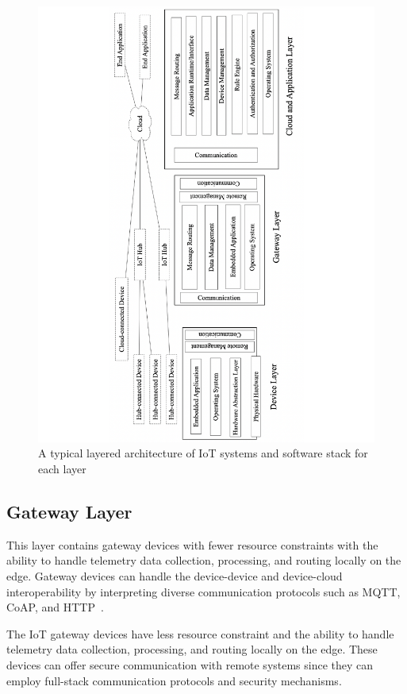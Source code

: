  \begin{figure}
  \centering 
   \includegraphics[height=0.9\textheight]{./imgs/arch1.pdf}
  \caption{A typical layered architecture of IoT systems and software stack for each layer}
  \label{fig:arch}
\end{figure}


\subsection{Gateway Layer}
This layer contains gateway devices with fewer resource constraints with the ability to handle telemetry data collection, processing, and routing locally on the edge. Gateway devices can handle the device-device and device-cloud interoperability by interpreting diverse communication protocols such as MQTT, CoAP, and HTTP~\cite{tschofenig2014architectural}. 

The IoT gateway devices have less resource constraint and the ability to handle telemetry data collection, processing, and routing locally on the edge. These devices can offer secure communication with remote systems since they can employ full-stack communication protocols and security mechanisms\cite{bormann2014terminology}.

